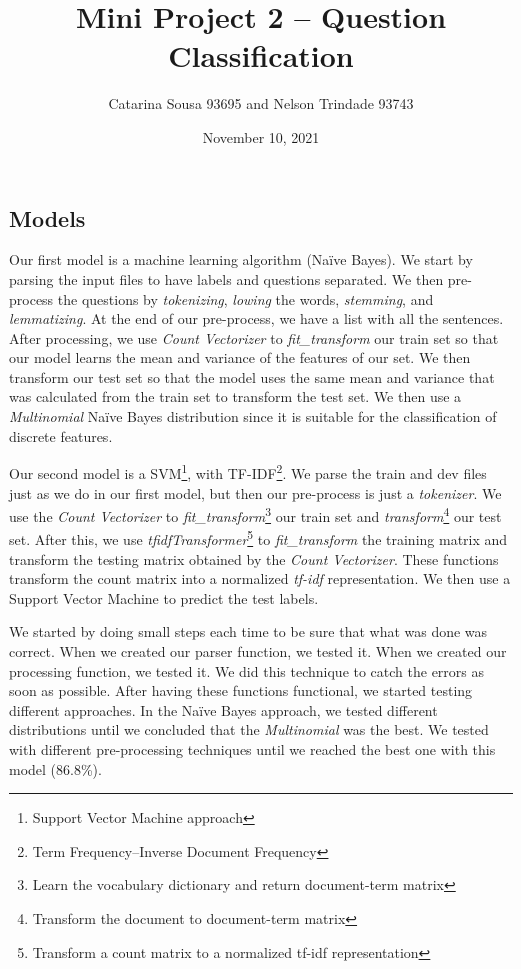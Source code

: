 \documentclass[11pt]{article}
\title{Mini Project 2 – Question Classification}
\author{Catarina Sousa 93695 and Nelson Trindade 93743}
\date{November 10, 2021}
\begin{document}
\maketitle

\begin{multicols}{2}

\section{Models}

Our first model is a machine learning algorithm (Naïve Bayes). We start by parsing the input files to have labels and questions separated. We then pre-process the questions by \emph{tokenizing}, \emph{lowing} the words, \emph{stemming}, and \emph{lemmatizing}. At the end of our pre-process, we have a list with all the sentences. After processing, we use \emph{Count Vectorizer} to \emph{fit\_transform} our train set so that our model learns the mean and variance of the features of our set. We then transform our test set so that the model uses the same mean and variance that was calculated from the train set to transform the test set. We then use a \emph{Multinomial} Naïve Bayes distribution since it is suitable for the classification of discrete features.

Our second model is a SVM\footnote[1]{Support Vector Machine approach}, with TF-IDF\footnote[2]{Term Frequency–Inverse Document Frequency}. We parse the train and dev files just as we do in our first model, but then our pre-process is just a \emph{tokenizer}. We use the \emph{Count Vectorizer} to \emph{fit\_transform}\footnote[3]{Learn the vocabulary dictionary and return document-term matrix} our train set and \emph{transform}\footnote[4]{Transform the document to document-term matrix} our test set. After this, we use \emph{tfidfTransformer}\footnote[5]{Transform a count matrix to a normalized tf-idf representation} to \emph{fit\_transform} the training matrix and transform the testing matrix obtained by the \emph{Count Vectorizer}. These functions transform the count matrix into a normalized \emph{tf-idf} representation. We then use a Support Vector Machine to predict the test labels.

We started by doing small steps each time to be sure that what was done was correct. When we created our parser function, we tested it. When we created our processing function, we tested it. We did this technique to catch the errors as soon as possible. After having these functions functional, we started testing different approaches. 
In the Naïve Bayes approach, we tested different distributions until we concluded that the \emph{Multinomial} was the best. We tested with different pre-processing techniques until we reached the best one with this model (86.8\%).


\end{multicols}
\end{document}
